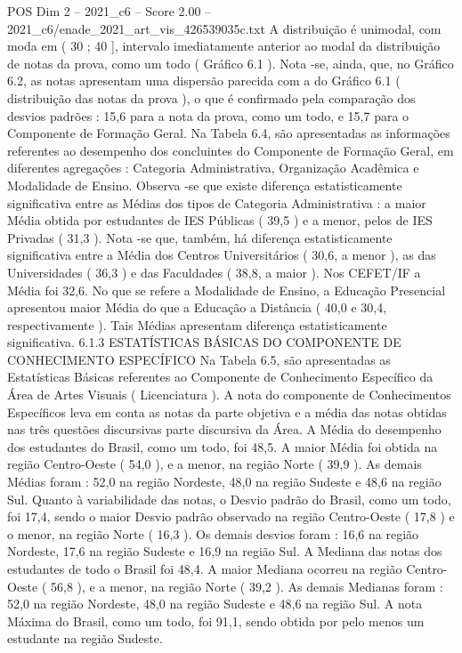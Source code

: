 \begin{textsample}{POS Dim 2 – 2021\_c6 – Score 2.00 – 2021\_c6/enade\_2021\_art\_vis\_426539035c.txt}
A distribuição é unimodal, com moda em ( 30 ; 40 ], intervalo imediatamente anterior ao modal da distribuição de notas da prova, como um todo ( Gráfico 6.1 ).
Nota -se, ainda, que, no Gráfico 6.2, as notas apresentam uma dispersão parecida com a do Gráfico 6.1 ( distribuição das notas da prova ), o que é confirmado pela comparação dos desvios padrões : 15,6 para a nota da prova, como um todo, e 15,7 para o Componente de Formação Geral.
Na Tabela 6.4, são apresentadas as informações referentes ao desempenho dos concluintes do Componente de Formação Geral, em diferentes agregações : Categoria Administrativa, Organização Acadêmica e Modalidade de Ensino.
Observa -se que existe diferença estatisticamente significativa entre as Médias dos tipos de Categoria Administrativa : a maior Média obtida por estudantes de IES Públicas ( 39,5 ) e a menor, pelos de IES Privadas ( 31,3 ).
Nota -se que, também, há diferença estatisticamente significativa entre a Média dos Centros Universitários ( 30,6, a menor ), as das Universidades ( 36,3 ) e das Faculdades ( 38,8, a maior ).
Nos CEFET/IF a Média foi 32,6.
No que se refere a Modalidade de Ensino, a Educação Presencial apresentou maior Média do que a Educação a Distância ( 40,0 e 30,4, respectivamente ).
Tais Médias apresentam diferença estatisticamente significativa. 6.1.3 ESTATÍSTICAS BÁSICAS DO COMPONENTE DE CONHECIMENTO ESPECÍFICO Na Tabela 6.5, são apresentadas as Estatísticas Básicas referentes ao Componente de Conhecimento Específico da Área de Artes Visuais ( Licenciatura ).
A nota do componente de Conhecimentos Específicos leva em conta as notas da parte objetiva e a média das notas obtidas nas três questões discursivas parte discursiva da Área.
A Média do desempenho dos estudantes do Brasil, como um todo, foi 48,5.
A maior Média foi obtida na região Centro-Oeste ( 54,0 ), e a menor, na região Norte ( 39,9 ).
As demais Médias foram : 52,0 na região Nordeste, 48,0 na região Sudeste e 48,6 na região Sul.
Quanto à variabilidade das notas, o Desvio padrão do Brasil, como um todo, foi 17,4, sendo o maior Desvio padrão observado na região Centro-Oeste ( 17,8 ) e o menor, na região Norte ( 16,3 ).
Os demais desvios foram : 16,6 na região Nordeste, 17,6 na região Sudeste e 16,9 na região Sul.
A Mediana das notas dos estudantes de todo o Brasil foi 48,4.
A maior Mediana ocorreu na região Centro-Oeste ( 56,8 ), e a menor, na região Norte ( 39,2 ).
As demais Medianas foram : 52,0 na região Nordeste, 48,0 na região Sudeste e 48,6 na região Sul.
A nota Máxima do Brasil, como um todo, foi 91,1, sendo obtida por pelo menos um estudante na região Sudeste.

\end{textsample}
